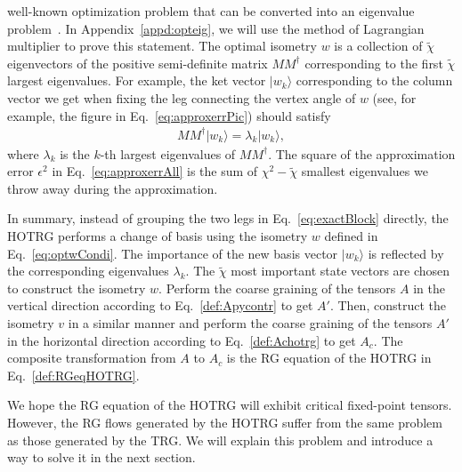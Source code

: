\documentclass[aps,prb,reprint,superscriptaddress]{revtex4-2}
\newcommand{\ket}[1]{|#1\rangle} \newcommand{\bra}[1]{\langle#1|}
\begin{document}
well-known optimization problem that can be converted into an eigenvalue
problem~\cite{ghojogh2019eigenvalue}. In Appendix~\ref{appd:opteig}, we
will use the method of Lagrangian multiplier to prove this statement.
The optimal isometry $w$ is a collection of $\tilde{\chi}$ eigenvectors
of the positive semi-definite matrix $M M^{\dagger}$ corresponding to
the first $\tilde{\chi}$ largest eigenvalues. For example, the ket
vector $\ket{w_k}$ corresponding to the column vector we get when fixing
the leg connecting the vertex angle of $w$ (see, for example, the figure
in Eq.~\eqref{eq:approxerrPic}) should satisfy 
%
\begin{align}\label{eq:optwCondi} M M^{\dagger}\ket{w_k} = \lambda_k
\ket{w_k},     \end{align}
%
where $\lambda_k$ is the $k$-th largest eigenvalues of $M M^{\dagger}$.
The square of the approximation error $\epsilon^2$ in
Eq.~\eqref{eq:approxerrAll} is the sum of $\chi^2 - \tilde{\chi}$
smallest eigenvalues we throw away during the approximation.
%

In summary, instead of grouping the two legs in
Eq.~\eqref{eq:exactBlock} directly, the HOTRG performs a change of basis
using the isometry $w$ defined in Eq.~\eqref{eq:optwCondi}. The
importance of the new basis vector $\ket{w_k}$ is reflected by the
corresponding eigenvalues $\lambda_k$.  The $\tilde{\chi}$ most
important state vectors are chosen to construct the isometry $w$.
Perform the coarse graining of the tensors $A$ in the vertical direction
according to Eq.~\eqref{def:Apycontr} to get $A'$. Then, construct the
isometry $v$ in a similar manner and perform the coarse graining of the
tensors $A'$ in the horizontal direction according to
Eq.~\eqref{def:Achotrg} to get $A_c$. The composite transformation from
$A$ to $A_c$ is the RG equation of the HOTRG in
Eq.~\eqref{def:RGeqHOTRG}.
%

We hope the RG equation of the HOTRG will exhibit critical fixed-point
tensors. However, the RG flows generated by the HOTRG suffer from the
same problem as those generated by the TRG. We will explain this problem
and introduce a way to solve it in the next section.
\end{document}
